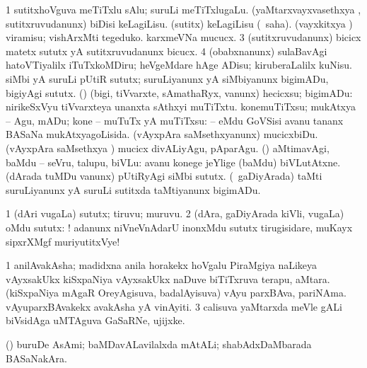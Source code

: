 \noindent
\gl{\pagu}
\expl{}
\bmng
\bnum
\num{1}  sutitxhoVguva meTiTxlu sAlu; suruLi meTiTxlugaLu. 
  
\banum
{} (yaMtarxvayxvasethxya \vi, sutitxruvudanunx) biDisi keLagiLisu. 
 (sutitx) keLagiLisu (\rUpa\ saha). 
 (vayxkitxya \vi) viramisu; vishArxMti tegeduko. 
 karxmeVNa mucucx. 
\eanum
\numie
\num{3}  (sutitxruvudanunx) bicicx matetx sututx yA sutitxruvudanunx bicucx. 
\num{4}  (obabxnanunx) sulaBavAgi hatoVTiyalilx iTuTxkoMDiru; heVgeMdare hAge ADisu; kiruberaLalilx kuNisu. 
  
\banum
{} siMbi yA suruLi pUtiR sututx; suruLiyanunx yA siMbiyanunx bigimADu, bigiyAgi sututx. 
 (\rUpa) (bigi, tiVvarxte, sAmathaRyx, \mo vanunx) hecicxsu; bigimADu:  nirikeSxVyu tiVvarxteya unanxta sAthxyi muTiTxtu. 
 konemuTiTxsu; mukAtxya -- Agu, mADu; kone -- muTuTx yA muTiTxsu:  -- eMdu GoVSisi avanu tananx BASaNa mukAtxyagoLisida. 
 (vAyxpAra saMsethxyanunx) mucicxbiDu. 
 (vAyxpAra saMsethxya \vi) mucicx divALiyAgu, pAparAgu. 
 (\AmA) aMtimavAgi, baMdu -- seVru, talupu, biVLu:  avanu konege jeYlige (baMdu) biVLutAtxne. 
 (dArada tuMDu \mo vanunx) pUtiRyAgi siMbi sututx. 
 (\kanmu\ gaDiyArada) taMti suruLiyanunx yA suruLi sutitxda taMtiyanunx bigimADu. 
\eanum
\numie
\enum
\emng
\eentry

\bentry
{}
\gl{\nA}
\expl{}
\bmng
\bnum
\num{1} (dAri \mo vugaLa) sututx; tiruvu; muruvu. 
\num{2} (dAra, gaDiyArada kiVli, \mo vugaLa) oMdu sututx: ! adanunx niVneVnAdarU inonxMdu sututx tirugisidare, muKayx sipxrXMgf muriyutitxVye! 
\enum
\emng
\eentry

\bentry
{}
\gl{\nA}
\bmng
\bnum
\num{1} anilAvakAsha; madidxna anila horakekx hoVgalu PiraMgiya naLikeya vAyxsakUkx kiSxpaNiya vAyxsakUkx naDuve biTiTxruva terapu, aMtara. 
\banum
{} (kiSxpaNiya mAgaR OreyAgisuva, badalAyisuva) vAyu parxBAva, pariNAma. 
 vAyuparxBAvakekx avakAsha yA vinAyiti. 
\eanum
\numie
\num{3} calisuva yaMtarxda meVle gALi biVsidAga uMTAguva GaSaRNe, ujijxke. 
\enum
\emng
\eentry

\bentry
{}
\gl{\nA}
\bmng
(\AmA) buruDe AsAmi; baMDavALavilalxda mAtALi; shabAdxDaMbarada BASaNakAra. 
\emng
\eentry

